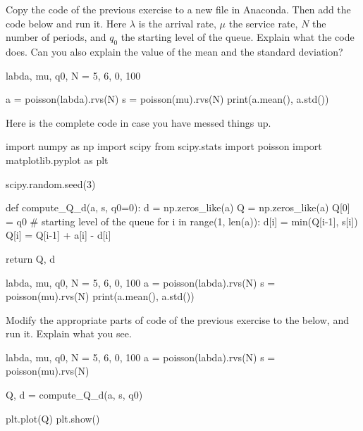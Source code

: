 \documentclass{scrartcl}
\begin{document}
\begin{exercise}\label{ex:4}
Copy the code of the previous exercise to a new file in Anaconda. Then add the code below and run it. Here $\lambda$ is the arrival rate, $\mu$ the service rate, $N$ the number of periods, and $q_0$ the starting level of the queue. Explain what the code does. Can you also explain the value of the mean and the standard deviation? 

  \begin{pyverbatim}

labda, mu, q0, N = 5, 6, 0, 100

a = poisson(labda).rvs(N)
s = poisson(mu).rvs(N)
print(a.mean(), a.std())
\end{pyverbatim}
\begin{solution}
  Here is the complete code in case you have messed things up.

\begin{pyverbatim}
import numpy as np
import scipy
from scipy.stats import poisson
import matplotlib.pyplot as plt

scipy.random.seed(3) 


def compute_Q_d(a, s, q0=0):
    d = np.zeros_like(a)
    Q = np.zeros_like(a)
    Q[0] = q0 # starting level of the queue
    for i in range(1, len(a)):
        d[i] = min(Q[i-1], s[i])
        Q[i] = Q[i-1] + a[i] - d[i]

    return Q, d


labda, mu, q0, N = 5, 6, 0, 100
a = poisson(labda).rvs(N)
s = poisson(mu).rvs(N)
print(a.mean(), a.std())
\end{pyverbatim}

\end{solution}
\end{exercise}

\begin{exercise}
  Modify  the appropriate parts of  code of the previous exercise to the below,  and run it. Explain what you see.

  \begin{pyverbatim}
labda, mu, q0, N = 5, 6, 0, 100
a = poisson(labda).rvs(N)
s = poisson(mu).rvs(N)

Q, d = compute_Q_d(a, s, q0)

plt.plot(Q)
plt.show()
  \end{pyverbatim}
\end{exercise}
\end{document}
